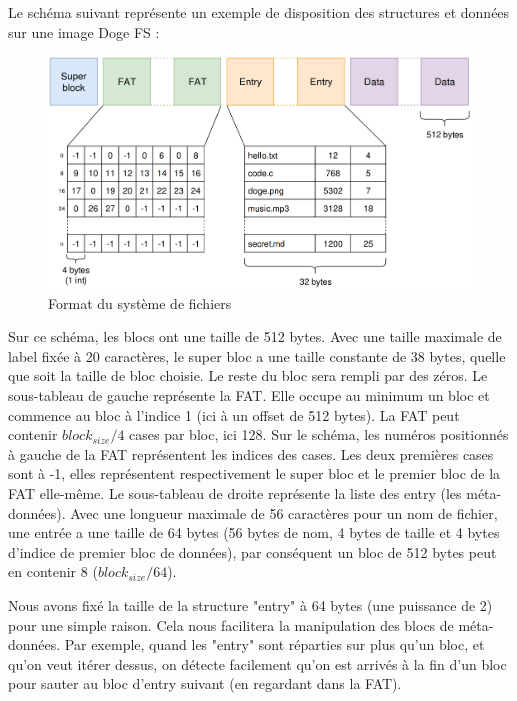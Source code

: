 \documentclass[a4paper, 12pt]{article}
\begin{document}
Le schéma suivant représente un exemple de disposition des structures et données sur une image Doge FS :
\begin{figure}
	\begin{center}
		\includegraphics[width=1.0\textwidth]{schema.png}
		\caption{Format du système de fichiers}
	\end{center}
\end{figure}
Sur ce schéma, les blocs ont une taille de 512 bytes. Avec une taille maximale de label fixée à 20 caractères,
le super bloc a une taille constante de 38 bytes, quelle que soit la taille de bloc choisie. Le reste du bloc
sera rempli par des zéros.
Le sous-tableau de gauche représente la FAT. Elle occupe au minimum un bloc et commence au bloc à l'indice 1 (ici à un offset de 512 bytes).
La FAT peut contenir $block_{size} / 4$ cases par bloc, ici 128. Sur le schéma, les numéros positionnés à gauche de la
FAT représentent les indices des cases. Les deux premières cases sont à -1, elles représentent respectivement
le super bloc et le premier bloc de la FAT elle-même.
Le sous-tableau de droite représente la liste des entry (les méta-données). Avec une longueur maximale de 56
caractères pour un nom de fichier, une entrée a une taille de 64 bytes (56 bytes de nom, 4 bytes de taille et
4 bytes d'indice de premier bloc de données), par conséquent un bloc de 512 bytes peut en contenir 8 
($block_{size} / 64$). 
\bigbreak

Nous avons fixé la taille de la structure "entry" à 64 bytes (une puissance de 2) pour une simple raison.
Cela nous facilitera la manipulation des blocs de méta-données. Par exemple,
quand les "entry" sont réparties sur plus qu'un bloc, et qu'on veut itérer dessus, on détecte facilement 
qu'on est arrivés à la fin d'un bloc pour sauter au bloc d'entry suivant (en regardant dans la FAT).
\bigbreak
\end{document}
